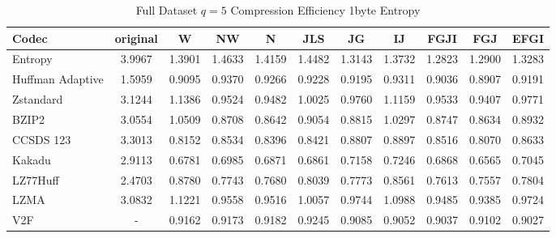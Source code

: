 \documentclass{article}
\begin{document}
\begin{table}[h!]
\centering
\caption{Full Dataset $q=5$ Compression Efficiency 1byte Entropy}
\begin{tabular}{|l|cccccccccc|}
\hline
Codec &  original &      W &     NW &      N &    JLS &     JG &     IJ &   FGJI &    FGJ &   EFGI \\
\hline
Entropy & 3.9967 & 1.3901 & 1.4633 & 1.4159 & 1.4482 & 1.3143 & 1.3732 & 1.2823 & 1.2900 & 1.3283 \\
\hline
Huffman Adaptive &    1.5959 & 0.9095 & 0.9370 & 0.9266 & 0.9228 & 0.9195 & 0.9311 & 0.9036 & 0.8907 & 0.9191 \\
Zstandard        &    3.1244 & 1.1386 & 0.9524 & 0.9482 & 1.0025 & 0.9760 & 1.1159 & 0.9533 & 0.9407 & 0.9771 \\
BZIP2            &    3.0554 & 1.0509 & 0.8708 & 0.8642 & 0.9054 & 0.8815 & 1.0297 & 0.8747 & 0.8634 & 0.8932 \\
CCSDS 123        &    3.3013 & 0.8152 & 0.8534 & 0.8396 & 0.8421 & 0.8807 & 0.8897 & 0.8516 & 0.8070 & 0.8633 \\
Kakadu           &    2.9113 & 0.6781 & 0.6985 & 0.6871 & 0.6861 & 0.7158 & 0.7246 & 0.6868 & 0.6565 & 0.7045 \\
LZ77Huff         &    2.4703 & 0.8780 & 0.7743 & 0.7680 & 0.8039 & 0.7773 & 0.8561 & 0.7613 & 0.7557 & 0.7804 \\
LZMA             &    3.0832 & 1.1221 & 0.9558 & 0.9516 & 1.0057 & 0.9744 & 1.0988 & 0.9485 & 0.9385 & 0.9724 \\
V2F              &    - & 0.9162 & 0.9173 & 0.9182 & 0.9245 & 0.9085 & 0.9052 & 0.9037 & 0.9102 & 0.9027 \\
\hline
\end{tabular}
\end{table}
\end{document}
